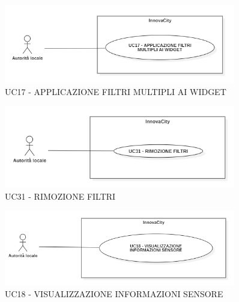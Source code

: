 
\begin{figure}[H]
    \centering
    \includegraphics[width=0.9\textwidth]{../Images/uc17.PNG}
    \caption{UC17 - APPLICAZIONE FILTRI MULTIPLI AI WIDGET}
\end{figure}


\begin{figure}[H]
    \centering
    \includegraphics[width=0.9\textwidth]{../Images/uc31.PNG}
    \caption{UC31 - RIMOZIONE FILTRI}
    \label{fig:UC7}
\end{figure}

\begin{figure}[H]
    \centering
    \includegraphics[width=0.9\textwidth]{../Images/uc18.PNG}
    \caption{UC18 - VISUALIZZAZIONE INFORMAZIONI SENSORE}
\end{figure}



